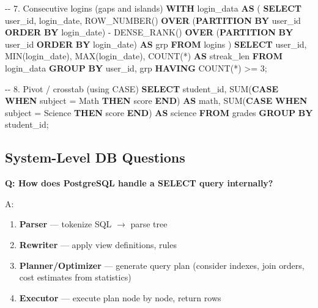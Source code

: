 \documentclass[11pt]{article}
\providecommand{\tightlist}{\setlength{\itemsep}{1pt}\setlength{\parskip}{0pt}}
\newenvironment{Shaded}{\begin{snugshade}}{\end{snugshade}}
\newcommand{\CommentTok}[1]{\textcolor[rgb]{0.48,0.49,0.49}{#1}}
\newcommand{\ControlFlowTok}[1]{\textcolor[rgb]{0.99,0.74,0.29}{\textbf{#1}}}
\newcommand{\DecValTok}[1]{\textcolor[rgb]{0.96,0.45,0.00}{#1}}
\newcommand{\FunctionTok}[1]{\textcolor[rgb]{0.56,0.27,0.68}{#1}}
\newcommand{\KeywordTok}[1]{\textcolor[rgb]{0.81,0.81,0.76}{\textbf{#1}}}
\newcommand{\NormalTok}[1]{\textcolor[rgb]{0.81,0.81,0.76}{#1}}
\newcommand{\OperatorTok}[1]{\textcolor[rgb]{0.81,0.81,0.76}{#1}}
\newcommand{\StringTok}[1]{\textcolor[rgb]{0.96,0.31,0.31}{#1}}
\begin{document}
\begin{Shaded}
\begin{Highlighting}[]
\CommentTok{{-}{-} 7. Consecutive logins (gaps and islands)}
\KeywordTok{WITH}\NormalTok{ login\_data }\KeywordTok{AS}\NormalTok{ (}
    \KeywordTok{SELECT}\NormalTok{ user\_id, login\_date,}
           \FunctionTok{ROW\_NUMBER}\NormalTok{() }\KeywordTok{OVER}\NormalTok{ (}\KeywordTok{PARTITION} \KeywordTok{BY}\NormalTok{ user\_id }\KeywordTok{ORDER} \KeywordTok{BY}\NormalTok{ login\_date)}
           \OperatorTok{{-}} \FunctionTok{DENSE\_RANK}\NormalTok{() }\KeywordTok{OVER}\NormalTok{ (}\KeywordTok{PARTITION} \KeywordTok{BY}\NormalTok{ user\_id }\KeywordTok{ORDER} \KeywordTok{BY}\NormalTok{ login\_date) }\KeywordTok{AS}\NormalTok{ grp}
    \KeywordTok{FROM}\NormalTok{ logins}
\NormalTok{)}
\KeywordTok{SELECT}\NormalTok{ user\_id, }\FunctionTok{MIN}\NormalTok{(login\_date), }\FunctionTok{MAX}\NormalTok{(login\_date), }\FunctionTok{COUNT}\NormalTok{(}\OperatorTok{*}\NormalTok{) }\KeywordTok{AS}\NormalTok{ streak\_len}
\KeywordTok{FROM}\NormalTok{ login\_data}
\KeywordTok{GROUP} \KeywordTok{BY}\NormalTok{ user\_id, grp}
\KeywordTok{HAVING} \FunctionTok{COUNT}\NormalTok{(}\OperatorTok{*}\NormalTok{) }\OperatorTok{\textgreater{}=} \DecValTok{3}\NormalTok{;}

\CommentTok{{-}{-} 8. Pivot / crosstab (using CASE)}
\KeywordTok{SELECT}
\NormalTok{    student\_id,}
    \FunctionTok{SUM}\NormalTok{(}\ControlFlowTok{CASE} \ControlFlowTok{WHEN}\NormalTok{ subject }\OperatorTok{=} \StringTok{\textquotesingle{}Math\textquotesingle{}} \ControlFlowTok{THEN}\NormalTok{ score }\ControlFlowTok{END}\NormalTok{) }\KeywordTok{AS}\NormalTok{ math,}
    \FunctionTok{SUM}\NormalTok{(}\ControlFlowTok{CASE} \ControlFlowTok{WHEN}\NormalTok{ subject }\OperatorTok{=} \StringTok{\textquotesingle{}Science\textquotesingle{}} \ControlFlowTok{THEN}\NormalTok{ score }\ControlFlowTok{END}\NormalTok{) }\KeywordTok{AS}\NormalTok{ science}
\KeywordTok{FROM}\NormalTok{ grades}
\KeywordTok{GROUP} \KeywordTok{BY}\NormalTok{ student\_id;}
\end{Highlighting}
\end{Shaded}

\subsection{System-Level DB Questions}\label{system-level-db-questions}

\textbf{Q: How does PostgreSQL handle a SELECT query internally?}

A:

\begin{enumerate}
\def\labelenumi{\arabic{enumi}.}
\tightlist
\item
  \textbf{Parser} --- tokenize SQL \(\rightarrow\) parse tree
\item
  \textbf{Rewriter} --- apply view definitions, rules
\item
  \textbf{Planner/Optimizer} --- generate query plan (consider indexes, join orders, cost estimates from statistics)
\item
  \textbf{Executor} --- execute plan node by node, return rows
\end{enumerate}
\end{document}
